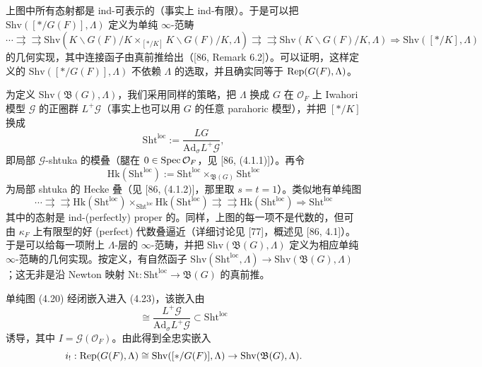 上图中所有态射都是 ind-可表示的（事实上 ind-有限）。于是可以把 $\mathrm{Shv}([*/G(F)],\Lambda)$ 定义为单纯 $\infty$-范畴
\[
\cdots\rightrightarrows\rightrightarrows\mathrm{Shv}(K\backslash G(F)/K\times_{[*/K]}K\backslash G(F)/K,\Lambda)\rightrightarrows\rightrightarrows\mathrm{Shv}(K\backslash G(F)/K,\Lambda)\Rightarrow\mathrm{Shv}([*/K],\Lambda)
\]
的几何实现，其中连接函子由真前推给出（[86, Remark 6.2]）。可以证明，这样定义的 $\mathrm{Shv}([*/G(F)],\Lambda)$ 不依赖 $\Lambda$ 的选取，并且确实同等于 $\operatorname{Rep}(G(F),\Lambda)$。

为定义 $\mathrm{Shv}(\mathfrak B(G),\Lambda)$，我们采用同样的策略，把 $\Lambda$ 换成 $G$ 在 $\mathcal O_F$ 上 Iwahori 模型 $\mathcal G$ 的正圈群 $L^+\mathcal G$（事实上也可以用 $G$ 的任意 parahoric 模型），并把 $[*/K]$ 换成
\begin{equation}
\mathrm{Sht}^{\mathrm{loc}}:=\frac{LG}{\mathrm{Ad}_\sigma L^+\mathcal G}, \tag{4.21}\label{eq:a2-4-21}
\end{equation}
即局部 $\mathcal G$-shtuka 的模叠（腿在 $0\in\operatorname{Spec}\mathcal O_F$，见 [86, (4.1.1)]）。再令
\begin{equation}
\mathrm{Hk}(\mathrm{Sht}^{\mathrm{loc}}):=\mathrm{Sht}^{\mathrm{loc}}\times_{\mathfrak B(G)}\mathrm{Sht}^{\mathrm{loc}} \tag{4.22}\label{eq:a2-4-22}
\end{equation}
为局部 shtuka 的 Hecke 叠（见 [86, (4.1.2)]，那里取 $s=t=1$）。类似地有单纯图
\begin{equation}
\cdots\rightrightarrows\rightrightarrows\mathrm{Hk}(\mathrm{Sht}^{\mathrm{loc}})\times_{\mathrm{Sht}^{\mathrm{loc}}}\mathrm{Hk}(\mathrm{Sht}^{\mathrm{loc}})\rightrightarrows\rightrightarrows\mathrm{Hk}(\mathrm{Sht}^{\mathrm{loc}})\Rightarrow\mathrm{Sht}^{\mathrm{loc}} \tag{4.23}\label{eq:a2-4-23}
\end{equation}
其中的态射是 ind-(perfectly) proper 的。同样，上图的每一项不是代数的，但可由 $\kappa_F$ 上有限型的好 (perfect) 代数叠逼近（详细讨论见 [77]，概述见 [86, 4.1]）。于是可以给每一项附上 $\Lambda$-层的 $\infty$-范畴，并把 $\mathrm{Shv}(\mathfrak B(G),\Lambda)$ 定义为相应单纯 $\infty$-范畴的几何实现。按定义，有自然函子 $\mathrm{Shv}(\mathrm{Sht}^{\mathrm{loc}},\Lambda)\to\mathrm{Shv}(\mathfrak B(G),\Lambda)$；这无非是沿 Newton 映射 $\mathrm{Nt}:\mathrm{Sht}^{\mathrm{loc}}\to\mathfrak B(G)$ 的真前推。

单纯图 (4.20) 经闭嵌入进入 (4.23)，该嵌入由
\begin{equation}
[*/I]\cong\frac{L^+\mathcal G}{\mathrm{Ad}_\sigma L^+\mathcal G}\subset\mathrm{Sht}^{\mathrm{loc}} \tag{4.24}\label{eq:a2-4-24}
\end{equation}
诱导，其中 $I=\mathcal G(\mathcal O_F)$。由此得到全忠实嵌入
\[
i_!:\operatorname{Rep}(G(F),\Lambda)\cong\mathrm{Shv}([*/G(F)],\Lambda)\to\mathrm{Shv}(\mathfrak B(G),\Lambda).
\]

